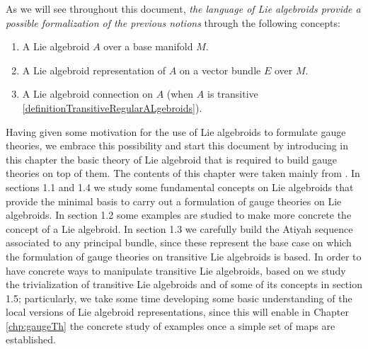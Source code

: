 As we will see throughout this document, \textit{the language of Lie algebroids provide a possible formalization of the previous notions} through the following concepts:
\begin{enumerate}
    \item A Lie algebroid $A$ over a base manifold $M$.
    
    \item A Lie algebroid representation of $A$ on a vector bundle $E$ over $M$.
    
    \item A Lie algebroid connection on $A$ (when $A$ is transitive \ref{definitionTransitiveRegularALgebroids}).
\end{enumerate}

Having given some motivation for the use of Lie algebroids to formulate gauge theories, we embrace this possibility and start this document by introducing in this chapter the basic theory of Lie algebroid that is required to build gauge theories on top of them. The contents of this chapter were taken mainly from \cite{Mackenzie2005}. In sections 1.1 and 1.4 we study some fundamental concepts on Lie algebroids that provide the minimal basis to carry out a formulation of gauge theories on Lie algebroids. In section 1.2 some examples are studied to make more concrete the concept of a Lie algebroid. In section 1.3 we carefully build the Atiyah sequence associated to any principal bundle, since these represent the base case on which the formulation of gauge theories on transitive Lie algebroids is based. In order to have concrete ways to manipulate transitive Lie algebroids, based on \cite{Fournel2011} we study the trivialization of transitive Lie algebroids and of some of its concepts in section 1.5; particularly, we take some time developing some basic understanding of the local versions of Lie algebroid representations, since this will enable in Chapter \ref{chp:gaugeTh} the concrete study of examples once a simple set of maps are established.


    
